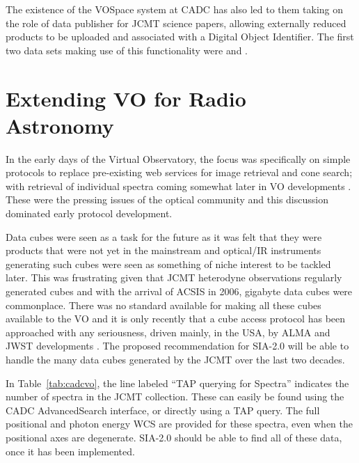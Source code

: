 \documentclass[final,authoryear,5p,times,twocolumn]{elsarticle}
\begin{document}
The existence of the VOSpace system at CADC has also led to them
taking on the role of data publisher for JCMT science papers, allowing
externally reduced products to be uploaded and associated with a
Digital Object Identifier. The first two data sets making use of this
functionality were \citet{2012MNRAS.424.3050W} and
\citet{2013ApJS..209....8D}.

\section{Extending VO for Radio Astronomy}

In the early days of the Virtual Observatory, the focus was
specifically on simple protocols \citep{siap,cone} to replace pre-existing
web services for image retrieval and cone search; with retrieval of
individual spectra coming somewhat later in VO developments
\citep{ssap,splatvo}. These were the pressing issues of the optical
community and this discussion dominated early protocol development.

Data cubes were seen as a task for the future as it was
felt that they were products that were not yet in the mainstream and
optical/IR instruments generating such cubes \citep[such as
the UIST IFU or TAURUS imaging Fabry-Perot spectrometer;][]{2004SPIE.5492.1160R,1982MNRAS.201..661A}
were seen as something of niche interest to be tackled later.
This was frustrating given that JCMT heterodyne
observations regularly generated cubes and with the arrival of ACSIS
in 2006, gigabyte data cubes were commonplace. There was no standard
available for making all these cubes available to the VO and it is
only recently \citep[e.g.,][]{2014AAS...22325505T} that a cube access
protocol has been approached with any seriousness, driven mainly, in
the USA, by ALMA and JWST developments \citep[e.g.,
MIRI;][]{2010SPIE.7731E..10W}. The proposed
recommendation for SIA-2.0 \citep{siav2}
will be able to handle the many data cubes generated by the JCMT
over the last two decades.

In Table~\ref{tab:cadcvo}, the line labeled ``TAP querying for Spectra''
indicates the number of spectra in the JCMT collection.  These can
easily be found using the CADC AdvancedSearch interface, or directly using
a TAP query.  The full positional and photon energy WCS are provided
for these spectra, even when the positional axes are degenerate.   SIA-2.0
should be able to find all of these data, once it has been implemented.
\end{document}
